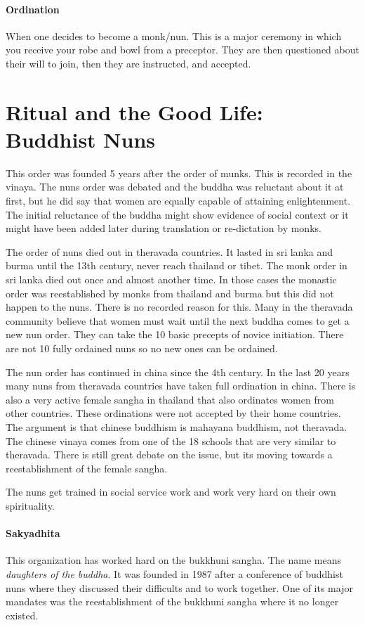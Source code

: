 \documentclass{article}
\begin{document}
\paragraph{Ordination}
\label{par:ordination}
When one decides to become a monk/nun. This is a major ceremony in which you receive your robe and bowl from a preceptor. They are then questioned about their will to join, then they are instructed, and accepted.


\section*{Ritual and the Good Life: Buddhist Nuns}
\label{sec:ritual_and_the_good_life_buddhist_nuns}
This order was founded 5 years after the order of munks. This is recorded in the vinaya. The nuns order was debated and the buddha was reluctant about it at first, but he did say that women are equally capable of attaining enlightenment. The initial reluctance of the buddha might show evidence of social context or it might have been added later during translation or re-dictation by monks.

The order of nuns died out in theravada countries. It lasted in sri lanka and burma until the 13th century, never reach thailand or tibet. The monk order in sri lanka died out once and almost another time. In those cases the monastic order was reestablished by monks from thailand and burma but this did not happen to the nuns. There is no recorded reason for this. Many in the theravada community believe that women must wait until the next buddha comes to get a new nun order. They can take the 10 basic precepts of novice initiation. There are not 10 fully ordained nuns so no new ones can be ordained.

The nun order has continued in china since the 4th century. In the last 20 years many nuns from theravada countries have taken full ordination in china. There is also a very active female sangha in thailand that also ordinates women from other countries. These ordinations were not accepted by their home countries. The argument is that chinese buddhism is mahayana buddhism, not theravada. The chinese vinaya comes from one of the 18 schools that are very similar to theravada. There is still great debate on the issue, but its moving towards a reestablishment of the female sangha.

The nuns get trained in social service work and work very hard on their own spirituality.

\paragraph{Sakyadhita}
\label{par:sakyadhita}
This organization has worked hard on the bukkhuni sangha. The name means \emph{daughters of the buddha}. It was founded in 1987 after a conference of buddhist nuns where they discussed their difficults and to work together. One of its major mandates was the reestablishment of the bukkhuni sangha where it no longer existed.
\end{document}
